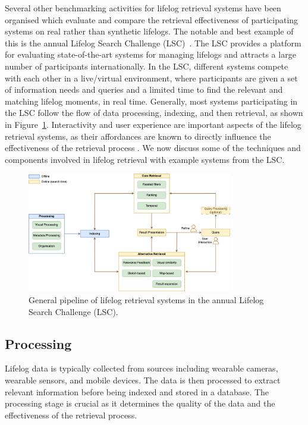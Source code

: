 \documentclass[11pt]{article}
\begin{document}
Several other benchmarking activities for lifelog retrieval systems have been organised which evaluate and compare the retrieval effectiveness of participating systems on real rather than synthetic lifelogs. The notable and best example of this is the annual Lifelog Search Challenge (LSC)~\cite{tran2023comparing}. The LSC provides a platform for evaluating  state-of-the-art systems for  managing lifelogs and  attracts a large number of participants internationally. In the LSC, different systems compete with each other in a live/virtual environment, where  participants are given a set of information needs and queries and a limited time to find the relevant and matching lifelog moments, in real time. Generally, most systems participating in the LSC follow the flow of data processing, indexing, and then retrieval, as shown in Figure~\ref{fig:lsc_pipeline}. Interactivity and user experience are  important aspects of the lifelog retrieval systems, as their affordances are known to directly influence the effectiveness of the retrieval process \cite{liu2019task}. We now discuss some of the techniques and components involved in lifelog retrieval with  example systems from the LSC. 

\begin{figure}
    \centering
    \includegraphics[width=0.8\textwidth]{submissions/Sematon2023/figs/lifelog_pipeline.png}
    \caption{General pipeline of lifelog retrieval systems in the annual Lifelog Search Challenge (LSC).}
    \label{fig:lsc_pipeline}
\end{figure}

\subsection{Processing}
Lifelog data is typically collected from  sources including wearable cameras, wearable sensors, and mobile devices. The data is then processed to extract relevant information before being indexed and stored in a database. The processing stage is crucial as it determines the quality of the data and the effectiveness of the retrieval process.
\end{document}
